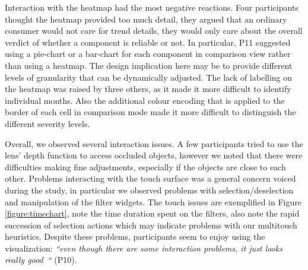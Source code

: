 Interaction with the heatmap had the most negative reactions. Four participants
thought the heatmap provided too much detail, they argued that an ordinary
consumer would not care for trend details, they would only care about the
overall verdict of whether a component is reliable or not. In particular, P11
suggested using a pie-chart or a bar-chart for each component in comparison view
rather than using a heatmap.  The design implication here may be to provide
different levels of granularity that can be dynamically adjusted. The lack of
labelling on the heatmap was raised by three others, as it made it more
difficult to identify individual months. Also the additional colour encoding
that is applied to the border of each cell in comparison mode made it more
difficult to distinguish the different severity levels. 

Overall, we observed several interaction issues. A few participants tried to
use the lens' depth function to access occluded objects, however we noted that
there were difficulties making fine adjustments, especially if the objects are
close to each other. Problems interacting with the touch surface was a general
concern voiced during the study, in particular we observed problems with
selection/deselection and manipulation of the filter widgets. The touch issues 
are exemplified in Figure \ref{figure:timechart}, note the time duration spent
on the filters, also note the rapid succession of selection actions which may
indicate problems with our multitouch heuristics. Despite these problems,
participants seem to enjoy using the visualization: \emph{``even though there
are some interaction problems, it just looks really good~``} (P10).


  
